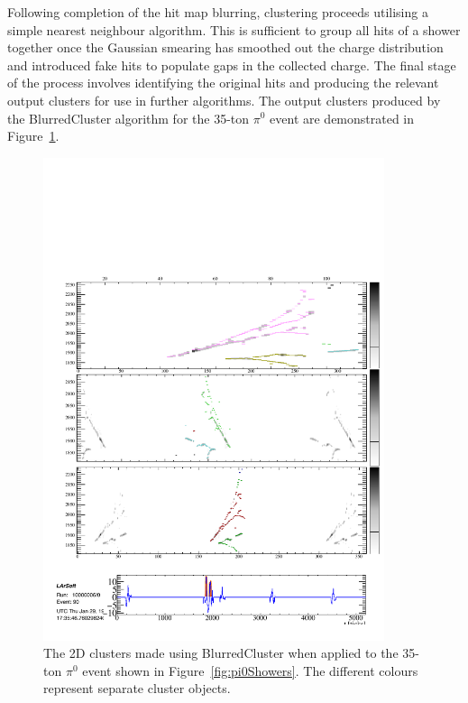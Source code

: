 Following completion of the hit map blurring, clustering proceeds utilising a simple nearest neighbour algorithm.  This is sufficient to group all hits of a shower together once the Gaussian smearing has smoothed out the charge distribution and introduced fake hits to populate gaps in the collected charge.  The final stage of the process involves identifying the original hits and producing the relevant output clusters for use in further algorithms.  The output clusters produced by the BlurredCluster algorithm for the 35-ton $\pi^0$ event are demonstrated in Figure~\ref{fig:pi0ShowersClusters}.

\begin{figure}
  \centering
  \includegraphics[width=10cm]{EVDPi0Clusters.pdf}
  \caption[The 2D clusters made using BlurredCluster when applied to the 35-ton $\pi^0$ event shown in Figure~\ref{fig:pi0Showers}.]{The 2D clusters made using BlurredCluster when applied to the 35-ton $\pi^0$ event shown in Figure~\ref{fig:pi0Showers}.  The different colours represent separate cluster objects.}
  \label{fig:pi0ShowersClusters}
\end{figure}


